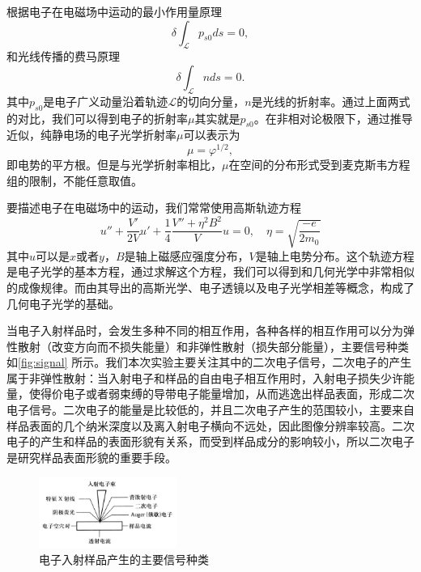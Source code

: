 \documentclass[font=default]{mpltx}
\begin{document}
根据电子在电磁场中运动的最小作用量原理
\begin{equation}
  \delta\int_\mathcal{L}p_{s0}ds=0,
\end{equation}
和光线传播的费马原理\begin{equation}
  \delta\int_\mathcal{L}nds=0.
\end{equation}其中$p_{s0}$是电子广义动量沿着轨迹$\mathcal{L}$的切向分量，$n$是光线的折射率。通过上面两式的对比，我们可以得到电子的折射率$\mu$其实就是$p_{s0}$。在非相对论极限下，通过推导近似，纯静电场的电子光学折射率$\mu$可以表示为
\begin{equation}
  \mu=\varphi^{1/2},
\end{equation}即电势的平方根。但是与光学折射率相比，$\mu$在空间的分布形式受到麦克斯韦方程组的限制，不能任意取值。

要描述电子在电磁场中的运动，我们常常使用高斯轨迹方程
\begin{equation}
  u''+\frac{V'}{2V}u'+\frac14\frac{V''+\eta^2 B^2}{V}u=0,\quad \eta=\sqrt{\frac{-e}{2m_0}}
\end{equation}其中$u$可以是$x$或者$y$，$B$是轴上磁感应强度分布，$V$是轴上电势分布。这个轨迹方程是电子光学的基本方程，通过求解这个方程，我们可以得到和几何光学中非常相似的成像规律。而由其导出的高斯光学、电子透镜以及电子光学相差等概念，构成了几何电子光学的基础。

当电子入射样品时，会发生多种不同的相互作用，各种各样的相互作用可以分为弹性散射（改变方向而不损失能量）和非弹性散射（损失部分能量），主要信号种类如\autoref{fig:signal} 所示。我们本次实验主要关注其中的二次电子信号，二次电子的产生属于非弹性散射：当入射电子和样品的自由电子相互作用时，入射电子损失少许能量，使得价电子或者弱束缚的导带电子能量增加，从而逃逸出样品表面，形成二次电子信号。二次电子的能量是比较低的，并且二次电子产生的范围较小，主要来自样品表面的几个纳米深度以及离入射电子横向不远处，因此图像分辨率较高。二次电子的产生和样品的表面形貌有关系，而受到样品成分的影响较小，所以二次电子是研究样品表面形貌的重要手段。
\begin{figure}
  \centering
  \includegraphics[width=0.4\textwidth]{fig/signal.png}
  \caption{电子入射样品产生的主要信号种类}
  \label{fig:signal}
\end{figure}
\end{document}
